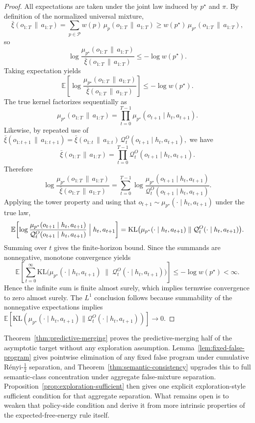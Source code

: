 \documentclass[11pt]{article}
\theoremstyle{remark}
\newcommand{\Pcal}{\mathcal{P}}
\newcommand{\Qcal}{\mathcal{Q}}
\newcommand{\E}{\mathbb{E}}
\newcommand{\KL}{\mathrm{KL}}
\newcommand{\givena}{\,\|\,}
\newcommand{\barxi}{\bar{\xi}}
\begin{document}
\begin{proof}
All expectations are taken under the joint law induced by \(p^\star\) and \(\pi\). By definition of the normalized universal mixture,
\[
\barxi(o_{1:T}\givena a_{1:T})
= \sum_{p \in \Pcal} w(p)\,\mu_p(o_{1:T}\givena a_{1:T})
\ge w(p^\star)\,\mu_{p^\star}(o_{1:T}\givena a_{1:T}),
\]
so
\[
\log \frac{\mu_{p^\star}(o_{1:T}\givena a_{1:T})}
{\barxi(o_{1:T}\givena a_{1:T})}
\le -\log w(p^\star).
\]
Taking expectation yields
\[
\E\!\left[
\log \frac{\mu_{p^\star}(o_{1:T}\givena a_{1:T})}
{\barxi(o_{1:T}\givena a_{1:T})}
\right]
\le -\log w(p^\star).
\]
The true kernel factorizes sequentially as
\[
\mu_{p^\star}(o_{1:T}\givena a_{1:T})
= \prod_{t=0}^{T-1} \mu_{p^\star}(o_{t+1}\mid h_t,a_{t+1}).
\]
Likewise, by repeated use of
\(
\barxi(o_{1:t+1}\givena a_{1:t+1})
= \barxi(o_{1:t}\givena a_{1:t})\,\Qcal_t^O(o_{t+1}\mid h_t,a_{t+1}),
\)
we have
\[
\barxi(o_{1:T}\givena a_{1:T})
= \prod_{t=0}^{T-1} \Qcal_t^O(o_{t+1}\mid h_t,a_{t+1}).
\]
Therefore
\[
\log \frac{\mu_{p^\star}(o_{1:T}\givena a_{1:T})}
{\barxi(o_{1:T}\givena a_{1:T})}
= \sum_{t=0}^{T-1}
\log
\frac{\mu_{p^\star}(o_{t+1}\mid h_t,a_{t+1})}
{\Qcal_t^O(o_{t+1}\mid h_t,a_{t+1})}.
\]
Applying the tower property and using that
\(
o_{t+1}\sim \mu_{p^\star}(\cdot\mid h_t,a_{t+1})
\)
under the true law,
\[
\E\!\left[
\log
\frac{\mu_{p^\star}(o_{t+1}\mid h_t,a_{t+1})}
{\Qcal_t^O(o_{t+1}\mid h_t,a_{t+1})}
\Bigm| h_t,a_{t+1}
\right]
=
\KL\bigl(
\mu_{p^\star}(\cdot\mid h_t,a_{t+1})
\;\|\;
\Qcal_t^O(\cdot\mid h_t,a_{t+1})
\bigr).
\]
Summing over \(t\) gives the finite-horizon bound. Since the summands are nonnegative, monotone convergence yields
\[
\E\!\left[
\sum_{t=0}^{\infty}
\KL\bigl(
\mu_{p^\star}(\cdot\mid h_t,a_{t+1})
\;\|\;
\Qcal_t^O(\cdot\mid h_t,a_{t+1})
\bigr)
\right]
\le -\log w(p^\star)<\infty.
\]
Hence the infinite sum is finite almost surely, which implies termwise convergence to zero almost surely. The \(L^1\) conclusion follows because summability of the nonnegative expectations implies
\(
\E[\KL(\mu_{p^\star}(\cdot\mid h_t,a_{t+1})\|\Qcal_t^O(\cdot\mid h_t,a_{t+1}))]\to 0.
\)
\end{proof}

Theorem~\ref{thm:predictive-merging} proves the predictive-merging half of the asymptotic target without any exploration assumption. Lemma~\ref{lem:fixed-false-program} gives pointwise elimination of any fixed false program under cumulative R\'enyi-\(\frac12\) separation, and Theorem~\ref{thm:semantic-consistency} upgrades this to full semantic-class concentration under aggregate false-mixture separation. Proposition~\ref{prop:exploration-sufficient} then gives one explicit exploration-style sufficient condition for that aggregate separation. What remains open is to weaken that policy-side condition and derive it from more intrinsic properties of the expected-free-energy rule itself.
\end{document}

